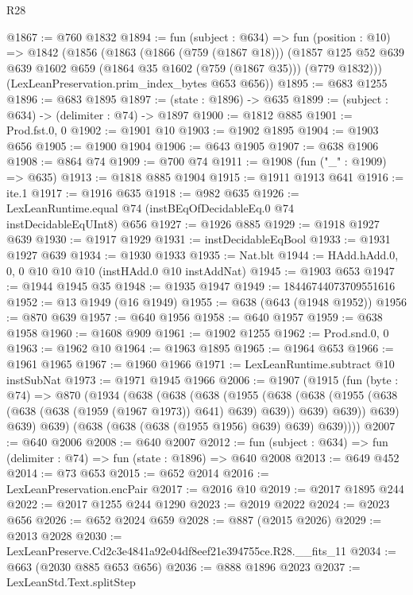 \begin{lexlean}{R28}
\begin{coremodule}
@1867 := @760 @1832
@1894 := fun (subject : @634) =>
  fun (position : @10) =>
  @1842
    (@1856
      (@1863
        (@1866 (@759 (@1867 @18)))
        (@1857 @125 @52 @639 @639 @1602 @659 (@1864 @35 @1602 (@759 (@1867 @35))) (@779 @1832)))
      (LexLeanPreservation.prim_index_bytes @653 @656))
@1895 := @683 @1255
@1896 := @683 @1895
@1897 := (state : @1896) -> @635
@1899 := (subject : @634) -> (delimiter : @74) -> @1897
@1900 := @1812 @885
@1901 := Prod.fst.{0, 0}
@1902 := @1901 @10
@1903 := @1902 @1895
@1904 := @1903 @656
@1905 := @1900 @1904
@1906 := @643 @1905
@1907 := @638 @1906
@1908 := @864 @74
@1909 := @700 @74
@1911 := @1908 (fun ("_" : @1909) => @635)
@1913 := @1818 @885 @1904
@1915 := @1911 @1913 @641
@1916 := ite.{1}
@1917 := @1916 @635
@1918 := @982 @635
@1926 := LexLeanRuntime.equal @74 (instBEqOfDecidableEq.{0} @74 instDecidableEqUInt8) @656
@1927 := @1926 @885
@1929 := @1918 @1927 @639
@1930 := @1917 @1929
@1931 := instDecidableEqBool
@1933 := @1931 @1927 @639
@1934 := @1930 @1933
@1935 := Nat.blt
@1944 := HAdd.hAdd.{0, 0, 0} @10 @10 @10 (instHAdd.{0} @10 instAddNat)
@1945 := @1903 @653
@1947 := @1944 @1945 @35
@1948 := @1935 @1947
@1949 := 18446744073709551616
@1952 := @13 @1949 (@16 @1949)
@1955 := @638 (@643 (@1948 @1952))
@1956 := @870 @639
@1957 := @640 @1956
@1958 := @640 @1957
@1959 := @638 @1958
@1960 := @1608 @909
@1961 := @1902 @1255
@1962 := Prod.snd.{0, 0}
@1963 := @1962 @10
@1964 := @1963 @1895
@1965 := @1964 @653
@1966 := @1961 @1965
@1967 := @1960 @1966
@1971 := LexLeanRuntime.subtract @10 instSubNat
@1973 := @1971 @1945 @1966
@2006 := @1907
    (@1915
      (fun (byte : @74) =>
      @870
        (@1934
          (@638
            (@638
              (@638
                (@1955
                  (@638
                    (@638 (@1955 (@638 (@638 (@638 (@1959 (@1967 @1973)) @641) @639) @639)) @639)
                    @639))
                @639)
              @639)
            @639)
          (@638 (@638 (@638 (@1955 @1956) @639) @639) @639))))
@2007 := @640 @2006
@2008 := @640 @2007
@2012 := fun (subject : @634) => fun (delimiter : @74) => fun (state : @1896) => @640 @2008
@2013 := @649 @452
@2014 := @73 @653
@2015 := @652 @2014
@2016 := LexLeanPreservation.encPair
@2017 := @2016 @10
@2019 := @2017 @1895 @244
@2022 := @2017 @1255 @244 @1290
@2023 := @2019 @2022
@2024 := @2023 @656
@2026 := @652 @2024 @659
@2028 := @887 (@2015 @2026)
@2029 := @2013 @2028
@2030 := LexLeanPreserve.Cd2c3e4841a92e04df8eef21e394755ce.R28.__fits_11
@2034 := @663 (@2030 @885 @653 @656)
@2036 := @888 @1896 @2023
@2037 := LexLeanStd.Text.splitStep

\end{coremodule}
\end{lexlean}
